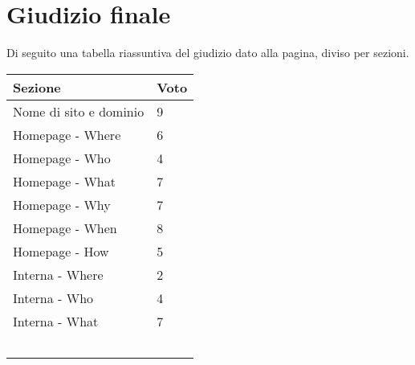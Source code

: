 \newpage
\section{Giudizio finale}
Di seguito una tabella riassuntiva del giudizio dato alla pagina, diviso per sezioni.


\begin{table}[htbp]
\centering
\begin{tabular}{|l|l|}
\hline
Sezione                & Voto \\ \hline
Nome di sito e dominio & 9    \\
Homepage - Where       & 6    \\
Homepage - Who         & 4    \\
Homepage - What        & 7    \\
Homepage - Why         & 7    \\
Homepage - When        & 8    \\
Homepage - How         & 5    \\
Interna - Where        & 2    \\
Interna - Who          & 4    \\
Interna - What         & 7    \\
                       &      \\
                       &      \\
                       &      \\
                       &      \\ \hline
                       &      \\ \hline
\end{tabular}
\end{table}

